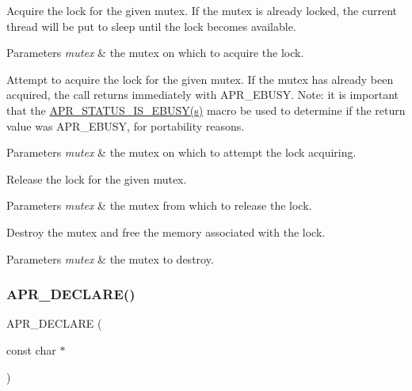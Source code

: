 Acquire the lock for the given mutex. If the mutex is already locked, the current thread will be put to sleep until the lock becomes available. 
\begin{DoxyParams}{Parameters}
{\em mutex} & the mutex on which to acquire the lock.\\
\hline
\end{DoxyParams}
Attempt to acquire the lock for the given mutex. If the mutex has already been acquired, the call returns immediately with A\+P\+R\+\_\+\+E\+B\+U\+SY. Note\+: it is important that the \mbox{\hyperlink{group___a_p_r___s_t_a_t_u_s___i_s_gabb92ad7b6ef304132de70e9e5cbaa896}{A\+P\+R\+\_\+\+S\+T\+A\+T\+U\+S\+\_\+\+I\+S\+\_\+\+E\+B\+U\+S\+Y(s)}} macro be used to determine if the return value was A\+P\+R\+\_\+\+E\+B\+U\+SY, for portability reasons. 
\begin{DoxyParams}{Parameters}
{\em mutex} & the mutex on which to attempt the lock acquiring.\\
\hline
\end{DoxyParams}
Release the lock for the given mutex. 
\begin{DoxyParams}{Parameters}
{\em mutex} & the mutex from which to release the lock.\\
\hline
\end{DoxyParams}
Destroy the mutex and free the memory associated with the lock. 
\begin{DoxyParams}{Parameters}
{\em mutex} & the mutex to destroy. \\
\hline
\end{DoxyParams}
\mbox{\label{group___a_p_r___global_mutex_gae52583174fa4e71624db3d4e9d617861}} 
\subsubsection{\texorpdfstring{A\+P\+R\+\_\+\+D\+E\+C\+L\+A\+R\+E()}{APR\_DECLARE()}\hspace{0.1cm}{\footnotesize\ttfamily [2/2]}}
{\footnotesize\ttfamily A\+P\+R\+\_\+\+D\+E\+C\+L\+A\+RE (\begin{DoxyParamCaption}\item[{const char $\ast$}]{ }\end{DoxyParamCaption})}

